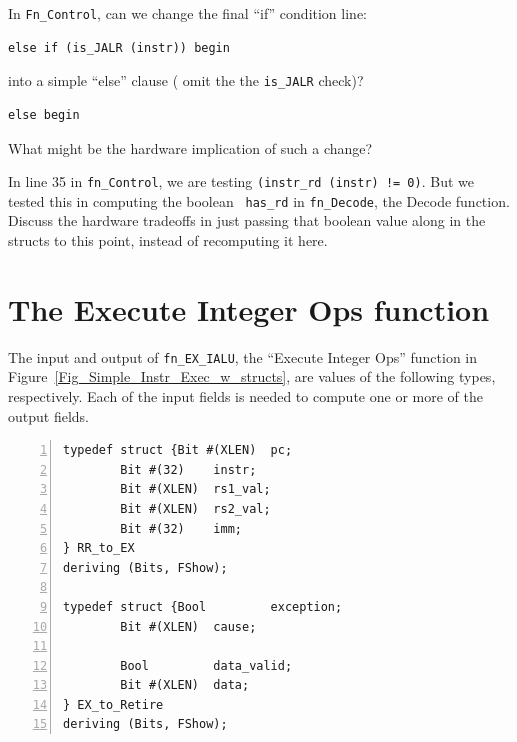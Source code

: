 \Exercise

In \verb|Fn_Control|, can we change the final ``if'' condition line:

{\small
\begin{Verbatim}[frame=single]
   else if (is_JALR (instr)) begin
\end{Verbatim}
}

into a simple ``else'' clause ({\ie} omit the the \verb|is_JALR| check)?

{\small
\begin{Verbatim}[frame=single]
   else begin
\end{Verbatim}
}

What might be the hardware implication of such a change?

\Exercise

In line 35 in {\tt fn\_Control}, we are testing {\tt (instr\_rd
(instr) != 0)}.  But we tested this in computing the boolean {\tt
has\_rd} in {\tt fn\_Decode}, the Decode function.  Discuss the hardware
tradeoffs in just passing that boolean value along in the structs to
this point, instead of recomputing it here.

\Endexercise


\section{The Execute Integer Ops function}

\label{Sec_EXI_function}


The input and output of \verb|fn_EX_IALU|, the ``Execute Integer Ops''
function in Figure~\ref{Fig_Simple_Instr_Exec_w_structs}, are values
of the following types, respectively.  Each of the input fields is
needed to compute one or more of the output fields.

{\small
\begin{Verbatim}[frame=single, numbers=left]
typedef struct {Bit #(XLEN)  pc;
		Bit #(32)    instr;
		Bit #(XLEN)  rs1_val;
		Bit #(XLEN)  rs2_val;
		Bit #(32)    imm;
} RR_to_EX
deriving (Bits, FShow);

typedef struct {Bool         exception;
		Bit #(XLEN)  cause;

		Bool         data_valid;
		Bit #(XLEN)  data;
} EX_to_Retire
deriving (Bits, FShow);
\end{Verbatim}
}

